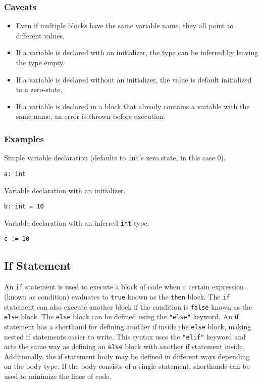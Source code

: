 \subsubsection{Caveats}

\begin{itemize}
    \item Even if multiple blocks have the same variable name, they all point to different values.
    \item If a variable is declared with an initializer, the type can be inferred by leaving the type empty.
    \item If a variable is declared without an initializer, the value is default initialized to a zero-state.
    \item If a variable is declared in a block that already contains a variable with the same name, an error is thrown before execution.
\end{itemize}

\subsubsection{Examples}

Simple variable declaration (defaults to \texttt{int}'s zero state, in this case 0).
\begin{verbatim}
a: int
\end{verbatim}
Variable declaration with an initializer.
\begin{verbatim}
b: int = 10
\end{verbatim}
Variable declaration with an inferred \texttt{int} type.
\begin{verbatim}
c := 10
\end{verbatim}

\subsection{If Statement}

An \texttt{if} statement is used to execute a block of code when a certain expression (known as condition) evaluates
to \texttt{true} known as the \texttt{then} block.
The \texttt{if} statement can also execute another block if the condition is \texttt{false} known as the \texttt{else} block.
The \texttt{else} block can be defined using the \texttt{"else"} keyword.
An if statement has a shorthand for defining another if inside the \texttt{else} block, making nested if statements easier to write.
This syntax uses the \texttt{"elif"} keyword and acts the same way as defining an \texttt{else} block with another if statement inside.
Additionally, the if statement body may be defined in different ways depending on the body type. If the body consists of a single statement,
shorthands can be used to minimize the lines of code.

